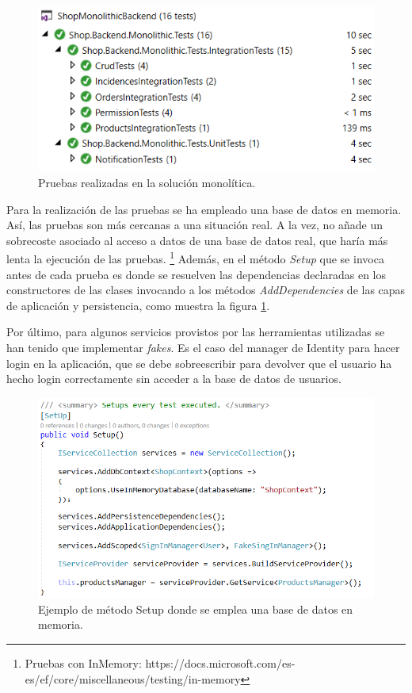 \documentclass[11pt,spanish,listoffigures]{tfgetsinf}
\begin{document}
\begin{figure}[h]
\centering
\includegraphics[scale=0.8]{Tests}
\caption{Pruebas realizadas en la solución monolítica.}
\end{figure}

Para la realización de las pruebas se ha empleado una base de datos en memoria. Así, las pruebas son más cercanas a una situación real. A la vez, no añade un sobrecoste asociado al acceso a datos de una base de datos real, que haría más lenta la ejecución de las pruebas. \footnote{ Pruebas con InMemory: https://docs.microsoft.com/es-es/ef/core/miscellaneous/testing/in-memory} Además, en el método \textit{Setup} que se invoca antes de cada prueba es donde se resuelven las dependencias declaradas en los constructores de las clases invocando a los métodos \textit{AddDependencies} de las capas de aplicación y persistencia, como muestra la figura \ref{fig:SetupTest}. 

Por último, para algunos servicios provistos por las herramientas utilizadas se han tenido que implementar \textit{fakes}. Es el caso del manager de Identity para hacer login en la aplicación, que se debe sobreescribir para devolver que el usuario ha hecho login correctamente sin acceder a la base de datos de usuarios.

\begin{figure}[h]
\centering
\includegraphics[scale=0.8]{SetupTest}
\caption{Ejemplo de método Setup donde se emplea una base de datos en memoria.}
\label{fig:SetupTest}
\end{figure}
\end{document}
